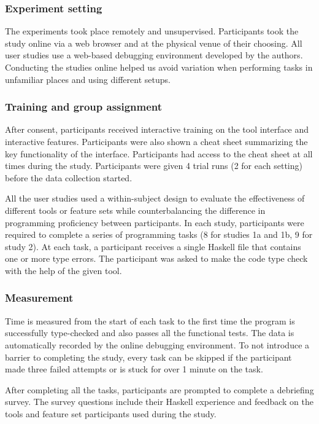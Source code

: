 

\subsubsection*{\textbf{Experiment setting}}
The experiments took place remotely and unsupervised. Participants took the study online via a web browser and at the physical venue of their choosing. All user studies use a web-based debugging environment developed by the authors. Conducting the studies online helped us avoid variation when performing tasks in unfamiliar places and using different setups. 


\subsubsection*{\textbf{Training and group assignment}}
After consent, participants received interactive training on the tool interface and interactive features. Participants were also shown a cheat sheet summarizing the key functionality of the interface. Participants had access to the cheat sheet at all times during the study. Participants were given 4 trial runs (2 for each setting) before the data collection started. 

All the user studies used a within-subject design to evaluate the effectiveness of different tools or feature sets while counterbalancing the difference in programming proficiency between participants. In each study, participants were required to complete a series of programming tasks (8 for studies 1a and 1b, 9 for study 2). At each task, a participant receives a single Haskell file that contains one or more type errors. The participant was asked to make the code type check with the help of the given tool.


\subsubsection*{\textbf{Measurement}}
Time is measured from the start of each task to the first time the program is successfully type-checked and also passes all the functional tests. The data is automatically recorded by the online debugging environment. To not introduce a barrier to completing the study, every task can be skipped if the participant made three failed attempts or is stuck for over 1 minute on the task.

After completing all the tasks, participants are prompted to complete a debriefing survey. The survey questions include their Haskell experience and feedback on the tools and feature set participants used during the study.

